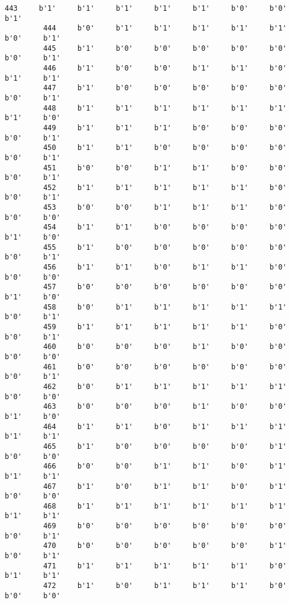 \documentclass[11pt]{article}
\begin{document}
\begin{Verbatim}[commandchars=\\\{\}]
         443     b'1'     b'1'     b'1'     b'1'     b'1'     b'0'     b'0'     b'1'   
         444     b'0'     b'1'     b'1'     b'1'     b'1'     b'1'     b'0'     b'1'   
         445     b'1'     b'0'     b'0'     b'0'     b'0'     b'0'     b'0'     b'1'   
         446     b'1'     b'0'     b'0'     b'1'     b'1'     b'0'     b'1'     b'1'   
         447     b'1'     b'0'     b'0'     b'0'     b'0'     b'0'     b'0'     b'1'   
         448     b'1'     b'1'     b'1'     b'1'     b'1'     b'1'     b'1'     b'0'   
         449     b'1'     b'1'     b'1'     b'0'     b'0'     b'0'     b'0'     b'1'   
         450     b'1'     b'1'     b'0'     b'0'     b'0'     b'0'     b'0'     b'1'   
         451     b'0'     b'0'     b'1'     b'1'     b'0'     b'0'     b'0'     b'1'   
         452     b'1'     b'1'     b'1'     b'1'     b'1'     b'0'     b'0'     b'1'   
         453     b'0'     b'0'     b'1'     b'1'     b'1'     b'0'     b'0'     b'0'   
         454     b'1'     b'1'     b'0'     b'0'     b'0'     b'0'     b'1'     b'0'   
         455     b'1'     b'0'     b'0'     b'0'     b'0'     b'0'     b'0'     b'1'   
         456     b'1'     b'1'     b'0'     b'1'     b'1'     b'0'     b'0'     b'0'   
         457     b'0'     b'0'     b'0'     b'0'     b'0'     b'0'     b'1'     b'0'   
         458     b'0'     b'1'     b'1'     b'1'     b'1'     b'1'     b'0'     b'1'   
         459     b'1'     b'1'     b'1'     b'1'     b'1'     b'0'     b'0'     b'1'   
         460     b'0'     b'0'     b'0'     b'1'     b'0'     b'0'     b'0'     b'0'   
         461     b'0'     b'0'     b'0'     b'0'     b'0'     b'0'     b'0'     b'1'   
         462     b'0'     b'1'     b'1'     b'1'     b'1'     b'1'     b'0'     b'0'   
         463     b'0'     b'0'     b'0'     b'1'     b'0'     b'0'     b'1'     b'0'   
         464     b'1'     b'1'     b'0'     b'1'     b'1'     b'1'     b'1'     b'1'   
         465     b'1'     b'0'     b'0'     b'0'     b'0'     b'1'     b'0'     b'0'   
         466     b'0'     b'0'     b'1'     b'1'     b'0'     b'1'     b'1'     b'1'   
         467     b'1'     b'0'     b'1'     b'1'     b'0'     b'1'     b'0'     b'0'   
         468     b'1'     b'1'     b'1'     b'1'     b'1'     b'1'     b'1'     b'1'   
         469     b'0'     b'0'     b'0'     b'0'     b'0'     b'0'     b'0'     b'1'   
         470     b'0'     b'0'     b'0'     b'0'     b'0'     b'1'     b'0'     b'1'   
         471     b'1'     b'1'     b'1'     b'1'     b'1'     b'0'     b'1'     b'1'   
         472     b'1'     b'0'     b'1'     b'1'     b'1'     b'0'     b'0'     b'0'   

\end{Verbatim}
\end{document}
